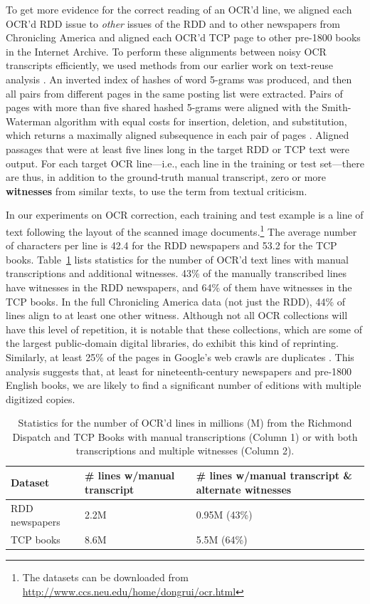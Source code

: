 \documentclass[twoside,11pt]{report}
\begin{document}
To get more evidence for the correct reading of an OCR'd line, we aligned each OCR'd RDD issue to \emph{other} issues of the RDD and to other newspapers from Chronicling America and aligned each OCR'd TCP page to other pre-1800 books in the Internet Archive. To perform these alignments between noisy OCR transcripts efficiently, we used methods from our earlier work on text-reuse analysis \citep{smith14:jcdl,wilkerson15:ajps,smith15:_comput_method_uncov_reprin_texts_anteb_newsp}. An inverted index of hashes of word 5-grams was produced, and then all pairs from different pages in the same posting list were extracted. Pairs of pages with more than five shared hashed 5-grams were aligned with the Smith-Waterman algorithm with equal costs for insertion, deletion, and substitution, which returns a maximally aligned subsequence in each pair of pages \citep{smith1981}. Aligned passages that were at least five lines long in the target RDD or TCP text were output. For each target OCR line---i.e., each line in the training or test set---there are thus, in addition to the ground-truth manual transcript, zero or more \textbf{witnesses} from similar texts, to use the term from textual criticism.

In our experiments on OCR correction, each training and test example is a line of text following the layout of the scanned image documents.\footnote{The datasets can be downloaded from \url{http://www.ccs.neu.edu/home/dongrui/ocr.html}} The average number of characters per line is 42.4 for the RDD newspapers and 53.2 for the TCP books. Table~\ref{tab:reprints} lists statistics for the number of OCR'd text lines with manual transcriptions and additional witnesses. 43\% of the manually transcribed lines have witnesses in the RDD newspapers, and 64\% of them have witnesses in the TCP books. In the full Chronicling America data (not just the RDD), 44\% of lines align to at least one other witness. Although not all OCR collections will have this level of repetition, it is notable that these collections, which are some of the largest public-domain digital libraries, do exhibit this kind of reprinting. Similarly, at least 25\% of the pages in Google's web crawls are duplicates \citep{henzinger06:_findin_near_duplic_web_pages}. This analysis suggests that, at least for nineteenth-century newspapers and pre-1800 English books, we are likely to find a significant number of editions with multiple digitized copies.

\begin{table}
  \centering
  \begin{tabular}{lp{}p{}}
    Dataset & \# lines w/manual transcript & \# lines w/manual transcript \& alternate witnesses \\ \hline
    RDD newspapers & 2.2M & 0.95M (43\%) \\
    TCP books & 8.6M & 5.5M (64\%) \\
  \end{tabular}
  \caption{Statistics for the number of OCR'd lines in millions (M) from the Richmond Dispatch and TCP Books with manual transcriptions (Column 1) or with both transcriptions and multiple witnesses (Column 2).}
  \label{tab:reprints}
\end{table}
\end{document}
